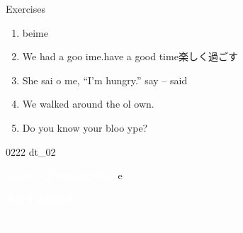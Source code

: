 \documentclass[aspectratio=169,xcolor={dvipsnames,table}]{beamer}
\begin{document}
\begin{frame}[plain]{Exercises }
  \Large
  \begin{enumerate}
    \item<2-> beime
    \item<4-> We had a goo  ime.\hfill{}{\small have a good time楽しく過ごす}
    \item<6-> She sai  o me, ``I'm hungry.'' \hfill{\small say -- said}
    \item<8-> We walked around the ol  own.
    \item<10-> Do you know your bloo  ype?
  \end{enumerate}

  \hfill{\tiny 0222}\,{\scriptsize {}\,dt\_02}

\end{frame}
\begin{frame}
  \centering
  \textcolor{white}{\Huge\bfseries Today's Pronunciation}e

  \vspace{30pt}

  \textcolor{white}{\Large 連続する破裂音}

  \textcolor{white}{\Large {} $+$ }

\end{frame}
\end{document}
